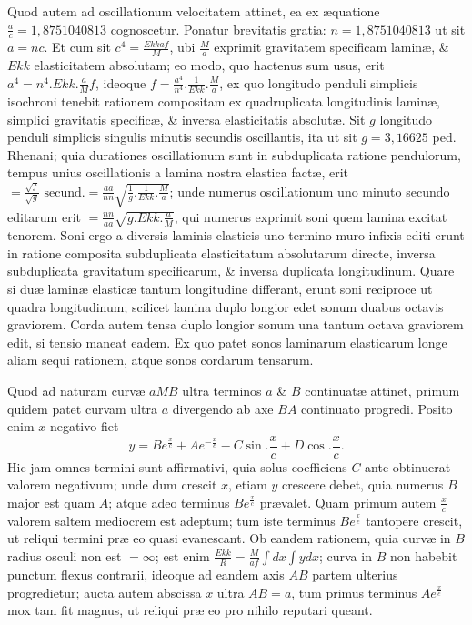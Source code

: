 Quod autem ad oscillationum velocitatem attinet, ea ex æquatione $\frac ac=1{,}8751040813$ cognoscetur. Ponatur brevitatis gratia: $n=1{,}8751040813$ ut sit $a=nc$. Et cum sit $c^4=\frac{Ekkaf}M$, ubi $\frac Ma$ exprimit gravitatem specificam laminæ, \& $Ekk$ elasticitatem absolutam; eo modo, quo hactenus sum usus, erit $a^4=n^4.Ekk.\frac aMf$, ideoque $f=\frac{a^4}{n^4}.\frac1{Ekk}.\frac Ma$, ex quo longitudo penduli simplicis isochroni tenebit rationem compositam ex quadruplicata longitudinis laminæ, simplici gravitatis specificæ, \& inversa elasticitatis absolutæ. Sit $g$ longitudo penduli simplicis singulis minutis secundis oscillantis, ita ut sit $g=3{,}16625$ ped. Rhenani; quia durationes oscillationum sunt in subduplicata ratione pendulorum, tempus unius oscillationis a lamina nostra elastica factæ, erit $=\frac{\sqrt f}{\sqrt g}\text{ secund.}=\frac{aa}{nn}\sqrt{\frac1g.\frac1{Ekk}.\frac Ma}$; unde numerus oscillationum uno minuto secundo editarum erit $=\frac{nn}{aa}\sqrt{g.Ekk.\frac aM}$, qui numerus exprimit soni quem lamina excitat tenorem. Soni ergo a diversis laminis elasticis uno termino muro infixis editi erunt in ratione composita subduplicata elasticitatum absolutarum directe, inversa subduplicata gravitatum specificarum, \& inversa duplicata longitudinum. Quare si duæ laminæ elasticæ tantum longitudine differant, erunt soni reciproce ut quadra longitudinum; scilicet lamina duplo longior edet sonum duabus octavis graviorem. Corda autem tensa duplo longior sonum una tantum octava graviorem edit, si tensio maneat eadem. Ex quo patet sonos laminarum elasticarum longe aliam sequi rationem, atque sonos cordarum tensarum.

Quod ad naturam curvæ $aMB$ ultra terminos $a$ \& $B$ continuatæ attinet, primum quidem patet curvam ultra $a$ divergendo ab axe $BA$ continuato progredi. Posito enim $x$ negativo fiet
\[y=Be^{\frac xc}+Ae^{-\frac xc}-C\sin.\frac xc+D\cos.\frac xc.\]
Hic jam omnes termini sunt affirmativi, quia solus coefficiens $C$ ante obtinuerat valorem negativum; unde dum crescit $x$, etiam $y$ crescere debet, quia numerus $B$ major est quam $A$; atque adeo terminus $Be^{\frac xc}$ prævalet. Quam primum autem $\frac xc$ valorem saltem mediocrem est adeptum; tum iste terminus $Be^{\frac xc}$ tantopere crescit, ut reliqui termini præ eo quasi evanescant. Ob eandem rationem, quia curvæ in $B$ radius osculi non est $=\infty$; est enim $\frac{Ekk}R=\frac M{af}\int dx\int ydx$; curva in $B$ non habebit punctum flexus contrarii, ideoque ad eandem axis $AB$ partem ulterius progredietur; aucta autem abscissa $x$ ultra $AB=a$, tum primus terminus $Ae^{\frac xc}$ mox tam fit magnus, ut reliqui præ eo pro nihilo reputari queant.

